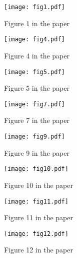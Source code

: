 \documentclass{article}
\begin{document}
\begin{figure}[h!tb]
	\texttt{[image: fig1.pdf]}
	\caption{Figure 1 in the paper}
\end{figure}

\begin{figure}[h!tb]
	\texttt{[image: fig4.pdf]}
	\caption{Figure 4 in the paper}
\end{figure}

\begin{figure}[h!tb]
	\texttt{[image: fig5.pdf]}
	\caption{Figure 5 in the paper}
\end{figure}

\begin{figure}[h!tb]
	\texttt{[image: fig7.pdf]}
	\caption{Figure 7 in the paper}
\end{figure}

\begin{figure}[h!tb]
	\texttt{[image: fig9.pdf]}
	\caption{Figure 9 in the paper}
\end{figure}

\begin{figure}[h!tb]
	\texttt{[image: fig10.pdf]}
	\caption{Figure 10 in the paper}
\end{figure}

\begin{figure}[h!tb]
	\texttt{[image: fig11.pdf]}
	\caption{Figure 11 in the paper}
\end{figure}

\begin{figure}[h!tb]
	\texttt{[image: fig12.pdf]}
	\caption{Figure 12 in the paper}
\end{figure}
\end{document}
